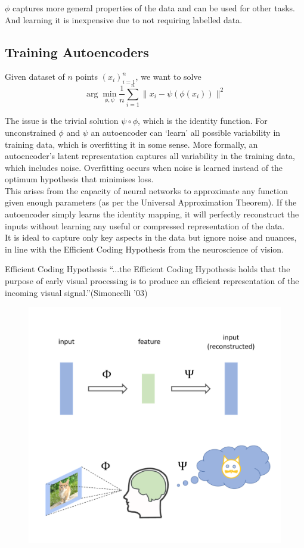 $\phi$ captures more general properties of the data and can be used for other tasks. And learning it is inexpensive due to not requiring labelled data.

\subsection{Training Autoencoders}
Given dataset of $n$ points $(x_i)_{i=1}^n$, we want to solve
\begin{equation}
    \arg\min_{\phi,\psi}\frac1n\sum_{i=1}^n\|x_i-\psi(\phi(x_i))\|^2
\end{equation}

The issue is the trivial solution $\psi \circ \phi$, which is the identity function. For unconstrained $\phi$ and $\psi$ an autoencoder can `learn' all possible variability in training data, which is overfitting it in some sense. More formally, an autoencoder's latent representation captures all variability in the training data, which includes noise. Overfitting occurs when noise is learned instead of the optimum hypothesis that minimises loss.\\

This arises from the capacity of neural networks to approximate any function given enough parameters (as per the Universal Approximation Theorem). If the autoencoder simply learns the identity mapping, it will perfectly reconstruct the inputs without learning any useful or compressed representation of the data.\\

It is ideal to capture only key aspects in the data but ignore noise and nuances, in line with the Efficient Coding Hypothesis from the neuroscience of vision. 

\begin{definitionbox}{Efficient Coding Hypothesis}
    “...the Efficient Coding Hypothesis holds that the purpose of early visual processing is to produce an efficient representation of the incoming visual signal.”(Simoncelli ’03)
    \begin{figure}[H]
        \centering
        \includegraphics[width=0.5\linewidth]{img/ECH.png}
        
        
    \end{figure}
\end{definitionbox}

